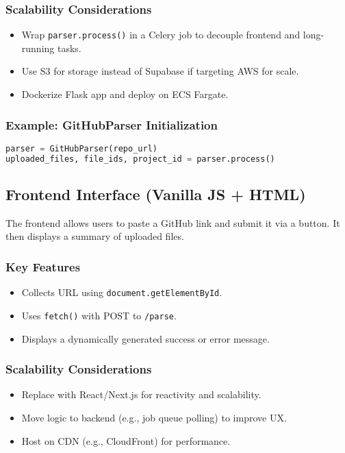 \documentclass{article}
\begin{document}
\subsubsection{Scalability Considerations}
\begin{itemize}
    \item Wrap \texttt{parser.process()} in a Celery job to decouple frontend and long-running tasks.
    \item Use S3 for storage instead of Supabase if targeting AWS for scale.
    \item Dockerize Flask app and deploy on ECS Fargate.
\end{itemize}

\subsubsection{Example: GitHubParser Initialization}
\begin{lstlisting}[language=Python]
parser = GitHubParser(repo_url)
uploaded_files, file_ids, project_id = parser.process()
\end{lstlisting}

\subsection{Frontend Interface (Vanilla JS + HTML)}
The frontend allows users to paste a GitHub link and submit it via a button. It then displays a summary of uploaded files.

\subsubsection{Key Features}
\begin{itemize}
    \item Collects URL using \texttt{document.getElementById}.
    \item Uses \texttt{fetch()} with POST to \texttt{/parse}.
    \item Displays a dynamically generated success or error message.
\end{itemize}

\subsubsection{Scalability Considerations}
\begin{itemize}
    \item Replace with React/Next.js for reactivity and scalability.
    \item Move logic to backend (e.g., job queue polling) to improve UX.
    \item Host on CDN (e.g., CloudFront) for performance.
\end{itemize}
\end{document}

